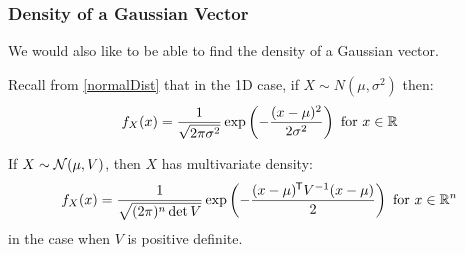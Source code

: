 \documentclass[../main.tex]{subfiles}
\begin{document}
\subsubsection{Density of a Gaussian Vector}
We would also like to be able to find the density of a Gaussian vector.
\begin{remark}[Recap]
  Recall from \cref{normalDist} that in the 1D case, if $X \sim N(\mu, \sigma^2)$ then:
  \[
    f_X(x) = \frac{1}{\sqrt{2\pi \sigma^2}} \exp\left(- \frac{(x - \mu)^2}{2\sigma^2}\right) \text{ for } x \in \mathbb{R}
  \]
\end{remark}
\begin{proposition}
  If $X \sim \operatorname{\mathcal{N}}(\mu, V)$, then $X$ has multivariate density: \label{gaussianMVDensity}
  \[
    f_{X}(x) = \frac{1}{\sqrt{(2\pi)^{n} \det V}}\exp\left(- \frac{(x - \mu)^{{\mkern-1.5mu\mathsf{T}}}V^{-1}(x - \mu)}{2}\right) \text{ for } x \in \mathbb{R}^{n}
  \]
  in the case when $V$ is positive definite.
\end{proposition}
\end{document}
